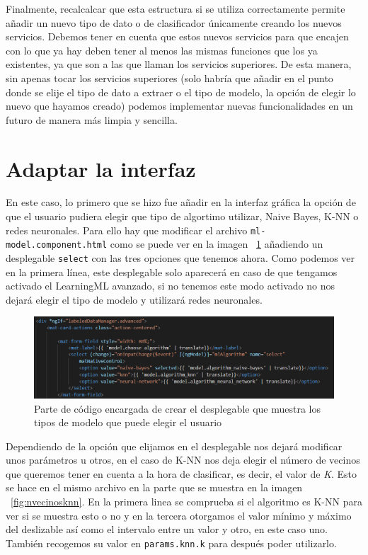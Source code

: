 \documentclass[a4paper, 12pt]{book}
\begin{document}
Finalmente, recalcalcar que esta estructura si se utiliza correctamente permite añadir un nuevo tipo de dato o de clasificador únicamente creando los nuevos servicios. Debemos tener en cuenta que estos nuevos servicios para que encajen con lo que ya hay deben tener al menos las mismas funciones que los ya existentes, ya que son a las que llaman los servicios superiores. De esta manera, sin apenas tocar los servicios superiores (solo habría que añadir en el punto donde se elije el tipo de dato a extraer o el tipo de modelo, la opción de elegir lo nuevo que hayamos creado) podemos implementar nuevas funcionalidades en un futuro de manera más limpia y sencilla.



\section{Adaptar la interfaz} 
\label{sec:interfaz}

En este caso, lo primero que se hizo fue añadir en la interfaz gráfica la opción de que el usuario pudiera elegir que tipo de algortimo utilizar, Naive Bayes, K-NN o redes neuronales. Para ello hay que modificar el archivo \texttt{ml-model.component.html} como se puede ver en la imagen ~\ref{fig:desplegable} añadiendo un desplegable \texttt{select} con las tres opciones que tenemos ahora. Como podemos ver en la primera línea, este desplegable solo aparecerá en caso de que tengamos activado el LearningML avanzado, si no tenemos este modo activado no nos dejará elegir el tipo de modelo y utilizará redes neuronales.\\

\begin{figure}
	\centering
	\includegraphics[width=12cm, keepaspectratio]{img/desplegable}
	\caption{Parte de código encargada de crear el desplegable que muestra los tipos de modelo que puede elegir el usuario}									\label{fig:desplegable}
\end{figure}

Dependiendo de la opción que elijamos en el desplegable nos dejará modificar unos parámetros u otros, en el caso de K-NN nos deja elegir el número de vecinos que queremos tener en cuenta a la hora de clasificar, es decir, el valor de \emph{K}. Esto se hace en el mismo archivo en la parte que se muestra en la imagen ~\ref{fig:nvecinosknn}. En la primera linea se comprueba si el algoritmo es K-NN para ver si se muestra esto o no y en la tercera otorgamos el valor mínimo y máximo del deslizable así como el intervalo entre un valor y otro, en este caso uno. También recogemos su valor en \texttt{params.knn.k} para después poder utilizarlo.
\end{document}
